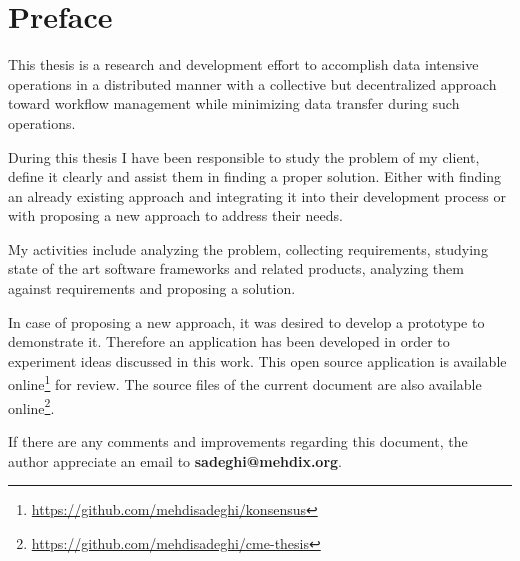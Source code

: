 \chapter*{Preface}
\label{cha:preface}
This thesis is a research and development effort to accomplish data intensive operations 
in a distributed manner with a collective but decentralized approach toward workflow management 
while minimizing data transfer during such operations.

During this thesis I have been responsible to study the problem of my client,
define it clearly and assist them in finding a proper solution.
Either with finding an already existing approach 
and integrating it into their development process 
or with proposing a new approach to address their needs. 

My activities include analyzing the problem, collecting requirements,
studying state of the art software frameworks and related products,
analyzing them against requirements and
proposing a solution.

In case of proposing a new approach,
it was desired to develop a prototype to demonstrate it.
Therefore an application has been developed in order to experiment ideas discussed in this work. 
This open source application is available online\footnote{\url{https://github.com/mehdisadeghi/konsensus}}
for review.
The source files of the current document are also available online\footnote{\url{https://github.com/mehdisadeghi/cme-thesis}}.

If there are any comments and improvements regarding this document, the author
appreciate an email to \textbf{sadeghi@mehdix.org}.